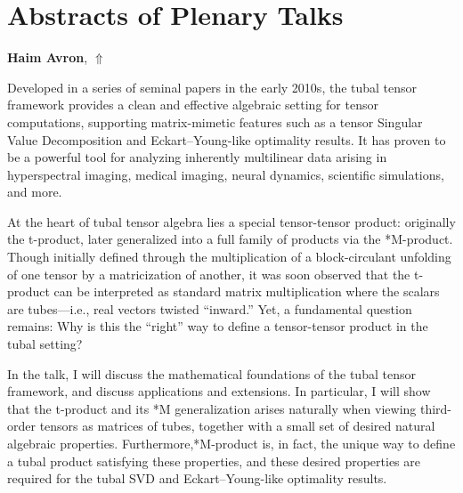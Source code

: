 \documentclass[ILAS2025-program.tex]{subfiles}
\begin{document}
\parindent=0pt
\parskip=5pt

\section{Abstracts of Plenary Talks}


\hypertarget{down0009}{}\begin{ilasabstract}
    
\textbf{Haim Avron},  \hfill \hyperlink{up0009}{$\Uparrow$}
    
    
\mtskip
    Developed in a series of seminal papers in the early 2010s, the tubal tensor framework provides a clean and effective algebraic setting for tensor computations, supporting matrix-mimetic features such as a tensor Singular Value Decomposition and Eckart–Young-like optimality results. It has proven to be a powerful tool for analyzing inherently multilinear data arising in hyperspectral imaging, medical imaging, neural dynamics, scientific simulations, and more.

At the heart of tubal tensor algebra lies a special tensor-tensor product: originally the t-product, later generalized into a full family of products via the *M-product. Though initially defined through the multiplication of a block-circulant unfolding of one tensor by a matricization of another, it was soon observed that the t-product can be interpreted as standard matrix multiplication where the scalars are tubes—i.e., real vectors twisted ``inward.'' Yet, a fundamental question remains: Why is this the ``right'' way to define a tensor-tensor product in the tubal setting?

In the talk, I will discuss the mathematical foundations of the tubal tensor framework, and discuss applications and extensions. In particular, I will show that the t-product and its *M generalization arises naturally when viewing third-order tensors as matrices of tubes, together with a small set of desired natural algebraic properties. Furthermore,*M-product is, in fact, the unique way to define a tubal product satisfying these properties, and these desired properties are required for the tubal SVD and Eckart–Young-like optimality results.


\end{ilasabstract}
    
\end{document}
